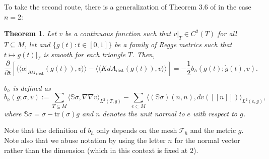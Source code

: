 \documentclass[11pt]{article}
\newtheorem{theorem}{Theorem}
\newcommand{\pdiff}[2]{\frac{\partial #1}{\partial #2}}
\newcommand{\iprod}[1]{\langle #1 \rangle}
\begin{document}
 To take the second route, there is a generalization of Theorem 3.6 of \cite{GaNe22} in the case $n = 2$:

\begin{theorem} 
\label{diffFh}
Let $v$ be a continuous function such that $v|_T \in C^2(T)$ for all $T \subseteq M$, let and $\{g(t) : t \in [0,1]\}$ be a family of Regge metrics such that $t \mapsto g(t)|_T$ is smooth for each triangle $T$. Then,
\[
\pdiff{}{t} [\iprod{\iprod{{\alpha|_{\partial M}}_\mathrm{dist}(g(t)),v}} - \iprod{\iprod{KdA_\mathrm{dist}(g(t)),v}}] = -\frac{1}{2}b_h(g(t);\dot g(t),v).
\]


$b_h$ is defined as
\begin{equation}\label{bheqn}
b_h(g;\sigma,v) := \sum_{T \subseteq M} \iprod{\mathbb{S}\sigma,\nabla\nabla v}_{L^2(T,g)} - \sum_{e \subset M} \iprod{(\mathbb{S}\sigma)(n,n),dv([\![n]\!])}_{L^2(e,g)},
\end{equation}
where $\mathbb{S}\sigma = \sigma - \mathrm{tr}(\sigma)g$ and $n$ denotes the unit normal to $e$ with respect to $g$.
\end{theorem}
Note that the definition of $b_h$ only depends on the mesh $\mathcal{T}_h$ and the metric $g$. Note also that we abuse notation by using the letter $n$ for the normal vector rather than the dimension (which in this context is fixed at $2$).
\end{document}
